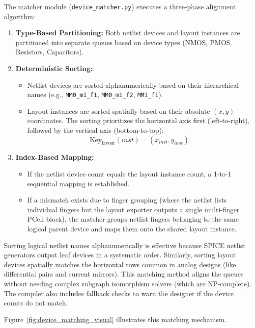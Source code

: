The matcher module (\texttt{device\_matcher.py}) executes a three-phase alignment algorithm:
\begin{enumerate}
    \item \textbf{Type-Based Partitioning:} Both netlist devices and layout instances are partitioned into separate queues based on device types (NMOS, PMOS, Resistors, Capacitors).
    \item \textbf{Deterministic Sorting:} 
        \begin{itemize}
            \item Netlist devices are sorted alphanumerically based on their hierarchical names (e.g., \texttt{MM0\_m1\_f1}, \texttt{MM0\_m1\_f2}, \texttt{MM1\_f1}).
            \item Layout instances are sorted spatially based on their absolute $(x, y)$ coordinates. The sorting prioritizes the horizontal axis first (left-to-right), followed by the vertical axis (bottom-to-top):
            \begin{equation}
                \text{Key}_{\text{layout}}(inst) = (x_{inst}, y_{inst})
            \end{equation}
        \end{itemize}
    \item \textbf{Index-Based Mapping:} 
        \begin{itemize}
            \item If the netlist device count equals the layout instance count, a 1-to-1 sequential mapping is established.
            \item If a mismatch exists due to finger grouping (where the netlist lists individual fingers but the layout exporter outputs a single multi-finger PCell block), the matcher groups netlist fingers belonging to the same logical parent device and maps them onto the shared layout instance.
        \end{itemize}
\end{enumerate}

Sorting logical netlist names alphanumerically is effective because SPICE netlist generators output leaf devices in a systematic order. Similarly, sorting layout devices spatially matches the horizontal rows common in analog designs (like differential pairs and current mirrors). This matching method aligns the queues without needing complex subgraph isomorphism solvers (which are NP-complete). The compiler also includes fallback checks to warn the designer if the device counts do not match.

Figure~\ref{fig:device_matching_visual} illustrates this matching mechanism.

